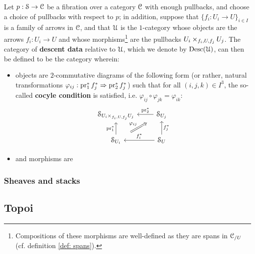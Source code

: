             \begin{definition} \label{def: descent_data}
                Let $p: \mathcal{S} \to \mathcal{C}$ be a fibration over a category $\mathcal{C}$ with enough pullbacks, and choose a choice of pullbacks with respect to $p$; in addition, suppose that $\{f_i: U_i \to U\}_{i \in I}$ is a family of arrows in $\mathcal{C}$, and that $\mathcal{U}$ is the $1$-category whose objects are the arrows $f_i: U_i \to U$ and whose morphisms\footnote{Compositions of these morphisms are well-defined as they are spans in $\mathcal{C}_{/U}$ (cf. definition \ref{def: spans}).} are the pullbacks $U_i \x_{f_i, U, f_j} U_j$. The category of \textbf{descent data} relative to $\mathcal{U}$, which we denote by $\mathrm{Desc}(\mathcal{U})$, can then be defined to be the category wherein:
                    \begin{itemize}
                        \item objects are $2$-commutative diagrams of the following form (or rather, natural transformations $\varphi_{ij}: \operatorname{pr}_1^*f_j^* \Rightarrow \operatorname{pr}_2^*f_j^*$) such that for all $(i, j, k) \in I^3$, the so-called \textbf{cocyle condition} is satisfied, i.e. $\varphi_{ij} \circ \varphi_{jk} = \varphi_{ik}$:
                            $$
                                \begin{tikzcd}
                                	{\S_{U_i \x_{f_i, U, f_j} U_j}} & {\S_{U_j}} \\
                                	{\S_{U_i}} & {\S_U}
                                	\arrow["{\pr_1^*}", from=2-1, to=1-1]
                                	\arrow["{f_i^*}"', from=2-2, to=2-1]
                                	\arrow["{f_j^*}"', from=2-2, to=1-2]
                                	\arrow["{\pr_2^*}"', from=1-2, to=1-1]
                                	\arrow["{\varphi_{ij}}", shorten <=11pt, shorten >=11pt, Rightarrow, from=2-1, to=1-2]
                                \end{tikzcd}
                            $$
                        \item and morphisms are 
                    \end{itemize}
            \end{definition}
            \begin{remark} \label{remark: concrete_descent_data}
                
            \end{remark}
            
        \subsubsection{Sheaves and stacks}
    
    \subsection{Topoi}